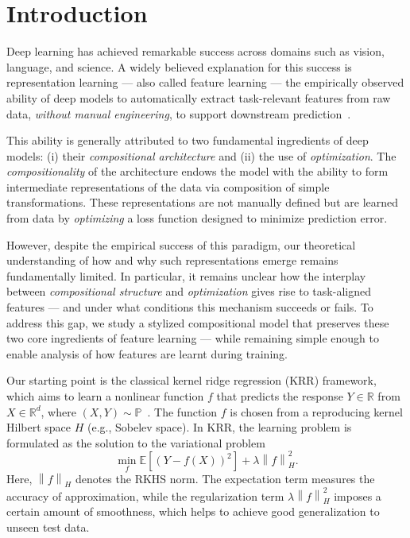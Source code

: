 \documentclass[sn-mathphys-num]{sn-jnl}%
\numberwithin{equation}{section}
\newcommand{\R}{\mathbb{R}}
\newcommand{\E}{\mathbb{E}}
\newcommand{\norm}[1]{\left\|{#1}\right\|} %
\renewcommand{\P}{\mathbb{P}}
\theoremstyle{thmstyleone}%
\theoremstyle{thmstyletwo}%
\theoremstyle{thmstylethree}%
\begin{document}
\section{Introduction}
Deep learning has achieved remarkable success across domains such as vision, language, and science. A widely believed explanation for this success is representation learning --- also called feature learning --- the empirically observed ability of deep models to automatically extract task-relevant features from raw data, \emph{without manual engineering}, to support downstream prediction~\cite{BengioCoVi13}. 

This ability is generally attributed to two fundamental ingredients of deep models: (i) their \emph{compositional architecture} and (ii) the use of \emph{optimization}. The \emph{compositionality} of the architecture endows the model with the ability to form intermediate representations of the data via composition of simple transformations. These representations are not manually defined but are learned from data by \emph{optimizing} a loss function designed to minimize prediction error.

However, despite the empirical success of this paradigm, our theoretical understanding of how and why such representations emerge remains fundamentally limited. In particular, it remains unclear how the interplay between \emph{compositional structure} and \emph{optimization} gives rise to task-aligned features --- and under what conditions this mechanism succeeds or fails. To address this gap, we study a stylized compositional model that preserves these two core ingredients of feature learning --- while remaining simple enough to enable analysis of how features are learnt during training.

Our starting point is the classical kernel ridge regression (KRR) framework, which aims to learn a nonlinear function $f$ that predicts the response $Y \in \R$ from $X \in \R^d$, where $(X, Y) \sim \P$~\cite{CuckerSm02}. The function $f$ is chosen from a reproducing kernel Hilbert space $H$ (e.g., Sobelev space). In KRR, the learning problem is formulated as the solution to the variational problem
\begin{equation*}
	\min_f \E[(Y- f(X))^2] + \lambda \norm{f}_H^2.
\end{equation*} 
Here, $\norm{f}_H$ denotes the RKHS norm. The expectation term measures the accuracy of approximation, while the regularization term $\lambda \norm{f}_H^2$ imposes a certain amount of smoothness,  which helps to achieve good 
generalization to unseen test data.
\end{document}
